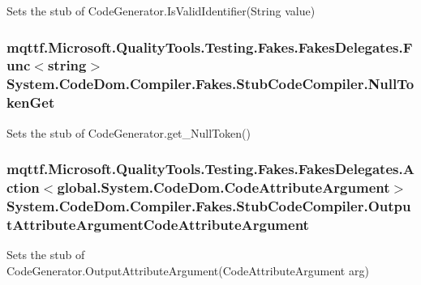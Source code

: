 Sets the stub of Code\-Generator.\-Is\-Valid\-Identifier(\-String value)

\hypertarget{class_system_1_1_code_dom_1_1_compiler_1_1_fakes_1_1_stub_code_compiler_aa6593c24b2f44746a2d48e8e5fa4b0c0}{
\subsubsection[{Null\-Token\-Get}]{\setlength{\rightskip}{0pt plus 5cm}mqttf.\-Microsoft.\-Quality\-Tools.\-Testing.\-Fakes.\-Fakes\-Delegates.\-Func$<$string$>$ System.\-Code\-Dom.\-Compiler.\-Fakes.\-Stub\-Code\-Compiler.\-Null\-Token\-Get}}\label{class_system_1_1_code_dom_1_1_compiler_1_1_fakes_1_1_stub_code_compiler_aa6593c24b2f44746a2d48e8e5fa4b0c0}


Sets the stub of Code\-Generator.\-get\-\_\-\-Null\-Token()

\hypertarget{class_system_1_1_code_dom_1_1_compiler_1_1_fakes_1_1_stub_code_compiler_a7eeeb088d329e80dc4cb891f8155b577}{
\subsubsection[{Output\-Attribute\-Argument\-Code\-Attribute\-Argument}]{\setlength{\rightskip}{0pt plus 5cm}mqttf.\-Microsoft.\-Quality\-Tools.\-Testing.\-Fakes.\-Fakes\-Delegates.\-Action$<$global.\-System.\-Code\-Dom.\-Code\-Attribute\-Argument$>$ System.\-Code\-Dom.\-Compiler.\-Fakes.\-Stub\-Code\-Compiler.\-Output\-Attribute\-Argument\-Code\-Attribute\-Argument}}\label{class_system_1_1_code_dom_1_1_compiler_1_1_fakes_1_1_stub_code_compiler_a7eeeb088d329e80dc4cb891f8155b577}


Sets the stub of Code\-Generator.\-Output\-Attribute\-Argument(\-Code\-Attribute\-Argument arg)

